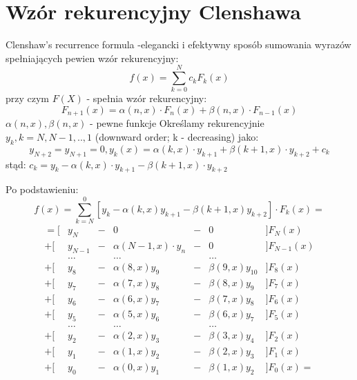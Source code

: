 \section{Wzór rekurencyjny Clenshawa}
\begin{frame}{Clenshaw's recurrence formula}
	-elegancki i efektywny sposób sumowania wyrazów spełniających pewien wzór rekurencyjny:
    $$f(x) = \sum_{k=0}^{N}c_kF_k(x)$$
    przy czym $F(X)$ - spełnia wzór rekurencyjny:
    $$F_{n+1}(x) = \alpha(n,x) \cdot F_n(x) + \beta(n,x) \cdot F_{n-1}(x)$$
    $\alpha(n,x),\beta(n,x)$ - pewne funkcje\newline
    Określamy rekurencyjnie $y_k,k = N,N-1,..,1$ (downward order; k - decreasing) jako:
    $$y_{N+2}=y_{N+1} = 0, y_k(x) = \alpha(k,x) \cdot y_{k+1}+\beta(k+1,x) \cdot y_{k+2}+c_k$$
    stąd: $c_k = y_k - \alpha(k,x) \cdot y_{k+1} - \beta(k+1,x) \cdot y_{k+2}$ \newline
\end{frame} 
\begin{frame}
	Po podstawieniu:
    $$f(x) = \sum_{k=N}^{0}[y_k-\alpha(k,x)y_{k+1}-\beta(k+1,x)y_{k+2}] \cdot F_k(x) = $$
    $$\left.\begin{array}{rcccccl}
    	=[ & y_N & - & 0 & - & 0 & ] F_N(x) \\
        +[ &y_{N-1}& - & \alpha(N-1,x)\cdot y_n & - & 0 & ] F_{N-1}(x) \\
         & \ldots & & \ldots & & \ldots & \\
         +[ & y_8 & - & \alpha(8,x)y_9 & - & \beta(9,x)y_{10} & ] F_8(x) \\
		+[ & y_7 & - & \alpha(7,x)y_8 & - & \beta(8,x)y_9 & ] F_7(x) \\
        +[ & y_6 & - & \alpha(6,x)y_7 & - & \beta(7,x)y_8 & ] F_6(x) \\
        +[ & y_5 & - & \alpha(5,x)y_6 & - & \beta(6,x)y_7 & ] F_5(x) \\
         & \ldots & & \ldots & & \ldots & \\
		+[ & y_2 & - & \alpha(2,x)y_3 & - & \beta(3,x)y_4 & ] F_2(x) \\
        +[ & y_1 & - & \alpha(1,x)y_2 & - & \beta(2,x)y_3 & ] F_1(x) \\
        +[ & y_0 & - & \alpha(0,x)y_1 & - & \beta(1,x)y_2 & ] F_0(x) =
    \end{array}\right.$$
\end{frame}
